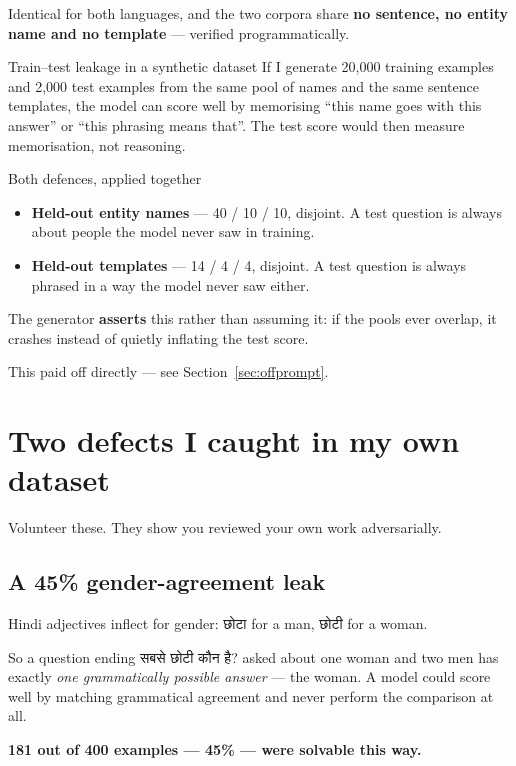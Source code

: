 \documentclass[11pt]{report}
\newcommand{\dn}[1]{{\devanagarifont #1}}
\begin{document}
Identical for both languages, and the two corpora share \textbf{no sentence, no
entity name and no template} --- verified programmatically.

\begin{concept}{Train--test leakage in a synthetic dataset}
If I generate 20,000 training examples and 2,000 test examples from the same
pool of names and the same sentence templates, the model can score well by
memorising ``this name goes with this answer'' or ``this phrasing means that''.
The test score would then measure memorisation, not reasoning.
\end{concept}

\begin{implementation}{Both defences, applied together}
\begin{itemize}
\item \textbf{Held-out entity names} --- 40 / 10 / 10, disjoint. A test question
      is always about people the model never saw in training.
\item \textbf{Held-out templates} --- 14 / 4 / 4, disjoint. A test question is
      always phrased in a way the model never saw either.
\end{itemize}

The generator \textbf{asserts} this rather than assuming it: if the pools ever
overlap, it crashes instead of quietly inflating the test score.
\end{implementation}

This paid off directly --- see Section~\ref{sec:offprompt}.

\section{Two defects I caught in my own dataset}

Volunteer these. They show you reviewed your own work adversarially.

\subsection{A 45\% gender-agreement leak}

\begin{warnbox}
Hindi adjectives inflect for gender: \dn{छोटा} for a man, \dn{छोटी} for a woman.

So a question ending \dn{सबसे छोटी कौन है?} asked about one woman and two men
has exactly \emph{one grammatically possible answer} --- the woman. A model
could score well by matching grammatical agreement and never perform the
comparison at all.

\textbf{181 out of 400 examples --- 45\% --- were solvable this way.}
\end{warnbox}
\end{document}
